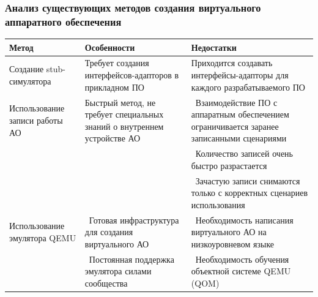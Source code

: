\begin{frame}%
    \frametitle{Анализ существующих методов создания виртуального аппаратного обеспечения}
    \newcommand{\tabitem}{{\textbullet}~}
        {\fontsize{8pt}{9.5pt}\selectfont
            \begin{longtable}{| p{3cm} | p{3cm} | p{4cm} |}
                \hline
                Метод & Особенности & Недостатки \\
                \hline
                    Создание stub-симулятора &
                    Требует создания интерфейсов-адапторов в прикладном ПО &
                    Приходится создавать интерфейсы-адапторы для каждого разрабатываемого ПО \\
                \hline
                    Использование записи работы АО &
                    Быстрый метод, не требует специальных знаний о внутреннем устройстве АО &
                    \tabitem Взаимодействие ПО с аппаратным обеспечением ограничивается заранее записанными сценариями \\
                \makecell{} & \makecell{} & \tabitem Количество записей очень быстро разрастается \\
                \makecell{} & \makecell{} & \tabitem Зачастую записи снимаются только с корректных сценариев использования \\
                \hline
                Использование эмулятора QEMU &
                \tabitem Готовая инфраструктура для создания виртуального АО &
                \tabitem Необходимость написания виртуального АО на низкоуровневом языке \\
                \makecell{} &
                \tabitem Постоянная поддержка эмулятора силами сообщества &
                \tabitem Необходимость обучения объектной системе QEMU (QOM) \\
                \hline
            \end{longtable}
        }
\end{frame}


